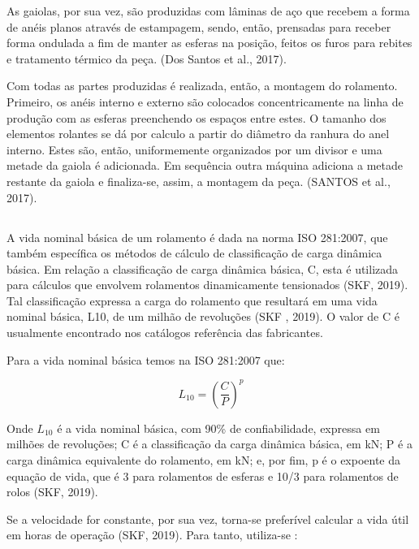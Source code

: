 \documentclass[
	12pt,				
	oneside,			
	a4paper,			
	english,			
	brazil,			
	]{abntex2ppgsi}
\begin{document}
As gaiolas, por sua vez, são produzidas com lâminas de aço que recebem a forma de anéis planos através de estampagem, sendo, então, prensadas para receber forma ondulada a fim de manter as esferas na posição, feitos os furos para rebites e tratamento térmico da peça. (Dos Santos et al., 2017).
 
Com todas as partes produzidas é realizada, então, a montagem do rolamento. Primeiro, os anéis interno e externo são colocados concentricamente na linha de produção com as esferas preenchendo os espaços entre estes. O tamanho dos elementos rolantes se dá por calculo a partir do diâmetro da ranhura do anel interno. Estes são, então, uniformemente organizados por um divisor e uma metade da gaiola é adicionada. Em sequência outra máquina adiciona a metade restante da gaiola e finaliza-se, assim, a montagem da peça. (SANTOS et al., 2017). 

\subsection{}

A vida nominal básica de um rolamento é dada na norma ISO 281:2007, que também específica os métodos de cálculo de classificação de carga dinâmica básica. Em relação a classificação de carga dinâmica básica, C, esta é utilizada para cálculos que envolvem rolamentos dinamicamente tensionados (SKF, 2019). Tal classificação expressa a carga do rolamento que resultará em uma vida nominal básica, L10, de um milhão de revoluções (SKF , 2019). O valor de C é usualmente encontrado nos catálogos referência das fabricantes.   

Para a vida nominal básica temos na ISO 281:2007 que:

\begin{equation}
	L_{10}= \left ( \frac{C}{P} \right )^{p}
	\label{eq: Vida Nominal Básica}
\end{equation}

Onde $L_{10}$ é a vida nominal básica, com 90\% de confiabilidade, expressa em milhões de revoluções; C é a classificação da carga dinâmica básica, em kN; P é a carga dinâmica equivalente do rolamento, em kN; e, por fim, p é o expoente da equação de vida, que é 3 para rolamentos de esferas e 10/3 para rolamentos de rolos (SKF, 2019).

Se a velocidade for constante, por sua vez, torna-se preferível calcular a vida útil em horas de operação (SKF, 2019). Para tanto, utiliza-se :
\end{document}
